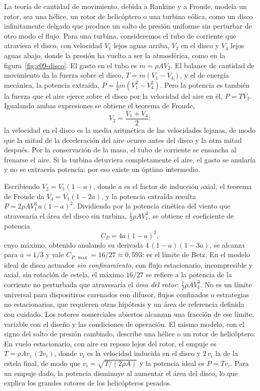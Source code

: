 \documentclass[10pt,openany]{book}
\begin{document}
La teoría de cantidad de movimiento, debida a Rankine y a Froude, modela un rotor, sea una hélice, un rotor de helicóptero o una turbina eólica, como un disco infinitamente delgado que produce un salto de presión uniforme sin perturbar de otro modo el flujo. Para una turbina, consideremos el tubo de corriente que atraviesa el disco, con velocidad \(V_1\) lejos aguas arriba, \(V_2\) en el disco y \(V_4\) lejos aguas abajo, donde la presión ha vuelto a ser la atmosférica, como en la figura~\ref{fig:c09-disco}. El gasto en el tubo es \(\dot m = \rho A V_2\). El balance de cantidad de movimiento da la fuerza sobre el disco, \(T = \dot m(V_1 - V_4)\), y el de energía mecánica, la potencia extraída, \(P = \tfrac12\dot m(V_1^{2} - V_4^{2})\). Pero la potencia es también la fuerza que el aire ejerce sobre el disco por la velocidad del aire en él, \(P = T V_2\). Igualando ambas expresiones se obtiene el teorema de Froude,
\begin{equation}
V_2 = \frac{V_1 + V_4}{2}: \label{eq:c09-froude}
\end{equation}
la velocidad en el disco es la media aritmética de las velocidades lejanas, de modo que la mitad de la deceleración del aire ocurre antes del disco y la otra mitad después. Por la conservación de la masa, el tubo de corriente se ensancha al frenarse el aire. Si la turbina detuviera completamente el aire, el gasto se anularía y no se extraería potencia: por eso existe un óptimo intermedio.

Escribiendo \(V_2 = V_1(1 - a)\), donde \(a\) es el factor de inducción axial, el teorema de Froude da \(V_4 = V_1(1 - 2a)\), y la potencia extraída resulta \(P = 2\rho A V_1^{3}\,a(1 - a)^{2}\). Dividiendo por la potencia cinética del viento que atravesaría el área del disco sin turbina, \(\tfrac12\rho A V_1^{3}\), se obtiene el coeficiente de potencia
\begin{equation}
C_P = 4a(1 - a)^{2}, \label{eq:c09-cp}
\end{equation}
cuyo máximo, obtenido anulando su derivada \(4\,(1 - a)(1 - 3a)\), se alcanza para \(a = 1/3\) y vale \(C_{P,\max} = 16/27 \approx 0{,}593\): es el límite de Betz. En el modelo ideal de disco actuador \emph{sin confinamiento}, con flujo estacionario, incompresible y axial, sin rotación de estela, el máximo \(16/27\) se refiere a la potencia de la corriente no perturbada que atravesaría el \emph{área del rotor}: \(\tfrac12\rho A V_1^{3}\). No es un límite universal para dispositivos carenados con difusor, flujos confinados o estrategias no estacionarias, que requieren otras hipótesis y un área de referencia definida con cuidado. Los rotores comerciales abiertos alcanzan una fracción de ese límite, variable con el diseño y las condiciones de operación. El mismo modelo, con el signo del salto de presión cambiado, describe una hélice o un rotor de helicóptero. En vuelo estacionario, con aire en reposo lejos del rotor, el empuje es \(T = \rho A v_i\,(2v_i)\), donde \(v_i\) es la velocidad inducida en el disco y \(2\,v_i\) la de la estela final, de modo que \(v_i = \sqrt{T/(2\rho A)}\) y la potencia ideal es \(P = T v_i\). Para un empuje dado, la potencia disminuye al aumentar el área del disco, lo que explica los grandes rotores de los helicópteros pesados.
\end{document}
